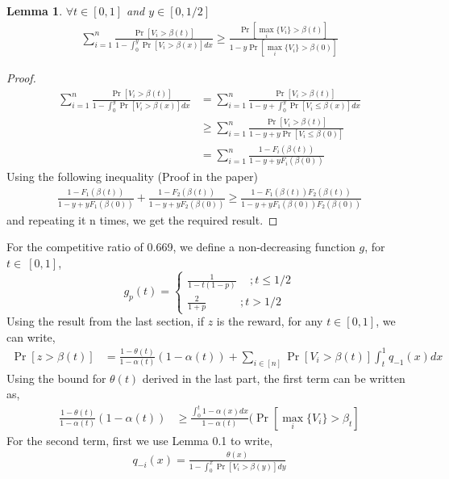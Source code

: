 \documentclass[10pt, letterpaper, twoside]{article}
\newtheorem{lemma}{Lemma}
\begin{document}
	\begin{lemma}
		$\forall t \in [0,1]$ and $y \in [0,1/2]$
		\begin{align*}
		\sum_{i=1}^{n} \frac{\Pr[V_{i}>\beta(t)]}{1-\int_{0}^{y} \Pr[V_{i}>\beta(x)] dx} \geq \frac{\Pr[\max_{i} \{V_{i}\} > \beta(t)]}{1-y\Pr[\max_{i} \{V_{i}\} > \beta(0)]}
		\end{align*}
	\end{lemma}
	\begin{proof}
		\begin{align*}
		\sum_{i=1}^{n} \frac{\Pr[V_{i}>\beta(t)]}{1-\int_{0}^{y} \Pr[V_{i}>\beta(x)] dx} &= \sum_{i=1}^{n} \frac{\Pr[V_{i}>\beta(t)]}{1-y+\int_{0}^{y} \Pr[V_{i}\leq\beta(x)] dx}\\
		&\geq \sum_{i=1}^{n} \frac{\Pr[V_{i}>\beta(t)]}{1-y+y\Pr[V_{i}\leq\beta(0)]}\\
		&=\sum_{i=1}^{n} \frac{1-F_{i}(\beta(t))}{1-y+yF_{i}(\beta(0))}
		\end{align*}
		Using the following inequality	 (Proof in the paper)
		\begin{align*} 
		\frac{1-F_{1}(\beta(t))}{1-y+yF_{1}(\beta(0))} + \frac{1-F_{2}(\beta(t))}{1-y+yF_{2}(\beta(0))} \geq \frac{1-F_{1}(\beta(t))F_{2}(\beta(t))}{1-y+yF_{1}(\beta(0))F_{2}(\beta(0))} 
		\end{align*}  
		and repeating it n times, we get the required result.
	\end{proof}
	For the competitive ratio of 0.669, we define a non-decreasing function $g$, for $t \in\ [0,1]$,
	$$g_{p}(t) = \begin{cases}
	\frac{1}{1-t(1-p)}  \quad \,; t \leq 1/2 \\
	\frac{2}{1+p} \quad \quad \quad; t > 1/2
	\end{cases}
	$$
	Using the result from the last section, if $z$ is the reward, for any $t \in [0,1]$, we can write,\\
	\begin{align*}
	\Pr[z > \beta(t)] &= \frac{1-\theta(t)}{1-\alpha(t)} (1-\alpha(t)) + \sum_{i \in [n]} \Pr[V_{i} > \beta(t)] \int_{t}^{1} q_{-1}(x) dx
	\end{align*}
	Using the bound for $\theta(t)$ derived in the last part, the first term can be written as,
	\begin{align*}
	\frac{1-\theta(t)}{1-\alpha(t)} (1-\alpha(t)) &\geq \frac{\int_{0}^{t} 1 - \alpha(x) dx}{1-\alpha(t)} (\Pr[\max_{i} \{V_{i}\} > \beta_{t}]
	\end{align*}
	For the second term, first we use Lemma 0.1 to write,
	\begin{align*}
	q_{-i}(x) = \frac{\theta(x)}{1-\int_{0}^{x} \Pr[V_{i} > \beta(y)]  dy}
	\end{align*}
\end{document}
